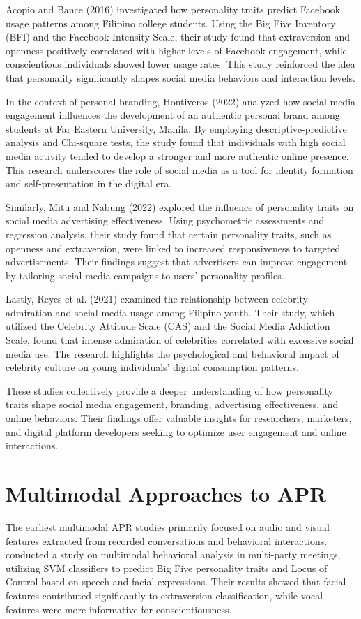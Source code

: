 Acopio and Bance (2016) investigated how personality traits predict Facebook usage patterns among Filipino college students. Using the Big Five Inventory (BFI) and the Facebook Intensity Scale, their study found that extraversion and openness positively correlated with higher levels of Facebook engagement, while conscientious individuals showed lower usage rates. This study reinforced the idea that personality significantly shapes social media behaviors and interaction levels.

In the context of personal branding, Hontiveros (2022) analyzed how social media engagement influences the development of an authentic personal brand among students at Far Eastern University, Manila. By employing descriptive-predictive analysis and Chi-square tests, the study found that individuals with high social media activity tended to develop a stronger and more authentic online presence. This research underscores the role of social media as a tool for identity formation and self-presentation in the digital era.

Similarly, Mitu and Nabung (2022) explored the influence of personality traits on social media advertising effectiveness. Using psychometric assessments and regression analysis, their study found that certain personality traits, such as openness and extraversion, were linked to increased responsiveness to targeted advertisements. Their findings suggest that advertisers can improve engagement by tailoring social media campaigns to users' personality profiles.

Lastly, Reyes et al. (2021) examined the relationship between celebrity admiration and social media usage among Filipino youth. Their study, which utilized the Celebrity Attitude Scale (CAS) and the Social Media Addiction Scale, found that intense admiration of celebrities correlated with excessive social media use. The research highlights the psychological and behavioral impact of celebrity culture on young individuals’ digital consumption patterns.

These studies collectively provide a deeper understanding of how personality traits shape social media engagement, branding, advertising effectiveness, and online behaviors. Their findings offer valuable insights for researchers, marketers, and digital platform developers seeking to optimize user engagement and online interactions.

\section{Multimodal Approaches to APR}
\label{sec: MMApproaches}
The earliest multimodal APR studies primarily focused on audio and visual features extracted from recorded conversations and behavioral interactions. \citet{Pianesi2008} conducted a study on multimodal behavioral analysis in multi-party meetings, utilizing SVM classifiers to predict Big Five personality traits and Locus of Control based on speech and facial expressions. Their results showed that facial features contributed significantly to extraversion classification, while vocal features were more informative for conscientiousness.

